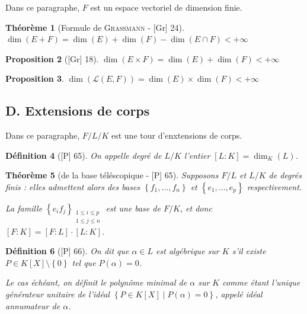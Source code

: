 \documentclass[10pt, a4paper, parskip=full, twoside, twocolumn]{report}
\newtheorem{definition}{Définition}
\newtheorem{theorem}[definition]{Théorème}
\newtheorem{proposition}[definition]{Proposition}
\begin{document}
\textcolor{paragraphtext}{Dans ce paragraphe, $F$ est un espace vectoriel de dimension finie.}

\begin{theorem}[Formule de \textsc{Grassmann} - \textnormal{[Gr] 24}]
	$\dim(E+F) = \dim(E) + \dim(F) - \dim(E\cap F) < +\infty$
\end{theorem}

\begin{proposition}[\textnormal{[Gr] 18}]
	$\dim(E\times F) = \dim(E) + \dim(F) < +\infty$
\end{proposition}

\begin{proposition}
	$\dim(\mathcal{L}(E,F)) = \dim(E)\times \dim(F) < +\infty$
\end{proposition}

\subsection*{D. Extensions de corps}

\textcolor{paragraphtext}{Dans ce paragraphe, $F/L/K$ est une tour d'enxtensions de corps.}

\begin{definition}[\textnormal{[P] 65}]
	On appelle \emph{degré de $L/K$} l'entier $[L:K] = \dim_K(L)$.
\end{definition}

\begin{theorem}[de la base téléscopique - \textnormal{[P] 65}]
	Supposons $F/L$ et $L/K$ de degrés finis :
	elles admettent alors des bases $\left\{f_1,\dots,f_n\right\}$
	et $\left\{e_1,\dots, e_p\right\}$ respectivement.

	La famille $\left\{e_if_j\right\}_{\substack{1\leq i\leq p \\ 1\leq j \leq n}}$
	est une base de $F/K$, et donc $[F:K] = [F:L]\cdot [L:K]$.
\end{theorem}

\begin{definition}[\textnormal{[P] 66}]
	On dit que $\alpha \in L$ est \emph{algébrique} sur $K$ s'il existe $P\in K[X]\setminus \left\{0\right\}$ tel 
	que $P(\alpha) = 0$.

	Le cas échéant, on définit le \emph{polynôme minimal de $\alpha$ sur $K$} comme étant l'unique générateur unitaire
	de l'idéal $\left\{P\in K[X] \mid P(\alpha) = 0\right\}$, appelé \emph{idéal annumateur de $\alpha$}.
\end{definition}
\end{document}

